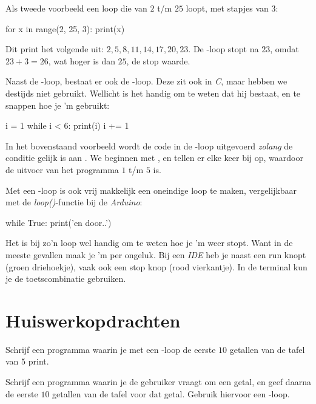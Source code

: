 Als tweede voorbeeld een loop die van $2$ t/m $25$ loopt, met stapjes van $3$:
\begin{python}
for x in range(2, 25, 3):
	print(x)
\end{python}
Dit print het volgende uit: $2, 5, 8, 11, 14, 17, 20, 23$. De -loop stopt na $23$, omdat $23+3 = 26$, wat hoger is dan $25$, de stop waarde. \newline\newline

Naast de -loop, bestaat er ook de -loop. Deze zit ook in \textit{C}, maar hebben we destijds niet gebruikt. Wellicht is het handig om te weten dat hij bestaat, en te snappen hoe je 'm gebruikt:
\begin{python}
i = 1
while i < 6:
	print(i)
	i += 1
\end{python}
In het bovenstaand voorbeeld wordt de code in de -loop uitgevoerd \textit{zolang} de conditie  gelijk is aan . We beginnen met , en tellen er elke keer  bij op, waardoor de uitvoer van het programma $1$ t/m $5$ is. \par

Met een -loop is ook vrij makkelijk een oneindige loop te maken, vergelijkbaar met de \textit{loop()}-functie bij de \textit{Arduino}:
\begin{python}
while True:
	print('en door..')
\end{python}

\begin{remark}
Het is bij zo'n loop wel handig om te weten hoe je 'm weer stopt. Want in de meeste gevallen maak je 'm per ongeluk. Bij een \textit{IDE} heb je naast een run knopt (groen driehoekje), vaak ook een stop knop (rood vierkantje). In de terminal kun je de toetscombinatie  gebruiken. 
\end{remark}

\newpage

\section{Huiswerkopdrachten}
\begin{exercise}
Schrijf een programma waarin je met een -loop de eerste $10$ getallen van de tafel van $5$ print.
\end{exercise}

\begin{exercise}
Schrijf een programma waarin je de gebruiker vraagt om een getal, en geef daarna de eerste $10$ getallen van de tafel voor dat getal. Gebruik hiervoor een -loop.
\end{exercise}

